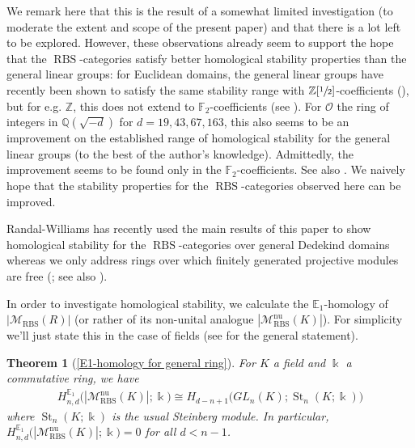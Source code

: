 \documentclass[12pt, reqno]{amsart}
\theoremstyle{plain}
\newtheorem*{theorem*}{Theorem}
\theoremstyle{definition}
\newcommand{\Z}{\mathbb Z}
\newcommand{\Q}{\mathbb Q}
\newcommand{\F}{\mathbb F}
\begin{document}
We remark here that this is the result of a somewhat limited investigation (to moderate the extent and scope of the present paper) and that there is a lot left to be explored. However, these observations already seem to support the hope that the $\operatorname{RBS}$-categories satisfy better homological stability properties than the general linear groups: for Euclidean domains, the general linear groups have recently been shown to satisfy the same stability range with $\Z[\sfrac{1}{2}]$-coefficients (\cite{BernardMillerSroka}), but for e.g. $\Z$, this does not extend to $\F_2$-coefficients (see ). For $\mathcal{O}$ the ring of integers in $\Q(\sqrt{-d})$ for $d=19, 43, 67, 163$, this also seems to be an improvement on the established range of homological stability for the general linear groups (to the best of the author's knowledge). Admittedly, the improvement seems to be found only in the $\F_2$-coefficients. See also . We naively hope that the stability properties for the $\operatorname{RBS}$-categories observed here can be improved.

Randal-Williams has recently used the main results of this paper to show homological stability for the $\operatorname{RBS}$-categories over general Dedekind domains whereas we only address rings over which finitely generated projective modules are free (\cite{RandalWilliams24}; see also ).

In order to investigate homological stability, we calculate the $\mathbb{E}_1$-homology of $|\mathscr{M}_{\operatorname{RBS}}(R)|$ (or rather of its non-unital analogue $|\mathscr{M}_{\operatorname{RBS}}^{\operatorname{nu}}(K)|$). For simplicity we'll just state this in the case of fields (see  for the general statement).

\begin{theorem*}[\ref{E1-homology for general ring}] For $K$ a field and $\Bbbk$ a commutative ring, we have
\begin{align*}
H^{\mathbb{E}_1}_{n,d}\big(|\mathscr{M}_{\operatorname{RBS}}^{\operatorname{nu}}(K)|;\Bbbk\big)\cong H_{d-n+1}\big(GL_n(K); \operatorname{St}_n(K;\Bbbk)\big)
\end{align*}
where $\operatorname{St}_n(K;\Bbbk)$ is the usual Steinberg module. In particular, $H^{\mathbb{E}_1}_{n,d}\big(|\mathscr{M}_{\operatorname{RBS}}^{\operatorname{nu}}(K)|;\Bbbk\big)=0$ 
for all $d< n-1$.
\end{theorem*}
\end{document}
